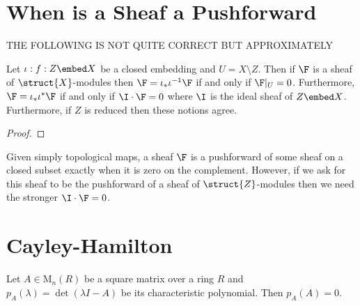 \documentclass[12pt]{article}
\begin{document}
\section{When is a Sheaf a Pushforward}

THE FOLLOWING IS NOT QUITE CORRECT BUT APPROXIMATELY

\begin{lemma}
Let $\iota : f : Z \embed X$ be a closed embedding and $U = X \setminus Z$. Then if $\F$ is a sheaf of $\struct{X}$-modules then $\F = \iota_* \iota^{-1} \F$ if and only if $\F |_U = 0$. Furthermore, $\F = \iota_* \iota^* \F$ if and only if $\I \cdot \F = 0$ where $\I$ is the ideal sheaf of $Z \embed X$. Furthermore, if $Z$ is reduced then these notions agree. 
\end{lemma}

\begin{proof}

\end{proof}

\begin{rmk}
Given simply topological maps, a sheaf $\F$ is a pushforward of some sheaf on a closed subset exactly when it is zero on the complement. However, if we ask for this sheaf to be the pushforward of a sheaf of $\struct{Z}$-modules then we need the stronger $\I \cdot \F = 0$. 
\end{rmk}

\section{Cayley-Hamilton}

\begin{theorem}
Let $A \in \mathrm{M}_{n}(R)$ be a square matrix over a ring $R$ and $p_A(\lambda) = \det{(\lambda I - A)}$ be its characteristic polynomial. Then $p_A(A) = 0$.
\end{theorem}
\end{document}

